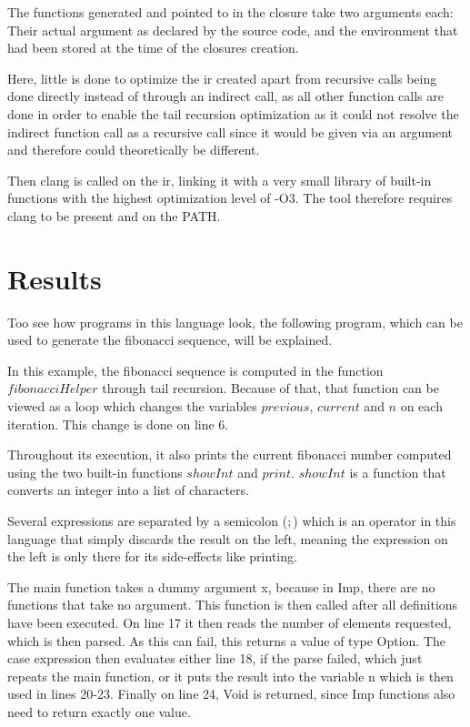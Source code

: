 \documentclass[12pt]{article}
\newcommand{\importListing}[1]{
    \begin{minipage}{\textwidth}
    
    \end{minipage}
}
\begin{document}
The functions generated and pointed to in the closure
take two arguments each: Their actual argument
as declared by the source code, and the environment that had been stored
at the time of the closures creation.

Here, little is done to optimize the \Gls{ir} created apart
from recursive calls being done directly instead of through an indirect
call, as all other function calls are done in order to enable
the tail recursion optimization as it could not resolve the indirect function call
as a recursive call since it would be given via an argument and therefore
could theoretically be different.

Then clang is called on the \Gls{ir}, linking it with a very small library of built-in
functions with the highest optimization level of -O3. The tool therefore requires
clang to be present and on the PATH.

\section{Results}
Too see how programs in this language look, the following program, which
can be used to generate the fibonacci sequence,
will be explained.

\importListing{code/fibonacci.tex}

In this example, the fibonacci sequence is computed in the function
$fibonacciHelper$ through tail recursion. Because of that, that function
can be viewed as a loop which changes the variables $previous$, $current$ and
$n$ on each iteration. This change is done on line 6.

Throughout its execution, it also prints the current fibonacci number
computed using the two built-in functions $showInt$ and $print$.
$showInt$ is a function that converts an integer into a list of characters.

Several expressions are separated by a semicolon ($;$) which is an operator
in this language that simply discards the result on the left, meaning
the expression on the left is only there for its side-effects like printing.

The main function takes a dummy argument x, because in Imp, there are no
functions that take no argument. This function is then called
after all definitions have been executed.
On line 17 it then reads the number of elements requested,
which is then parsed. As this can fail, this returns a
value of type Option. The case expression then evaluates either line
18, if the parse failed, which just repeats the main function,
or it puts the result into the variable n which is then used in
lines 20-23. Finally on line 24, Void is returned, since Imp functions
also need to return exactly one value.
\end{document}
